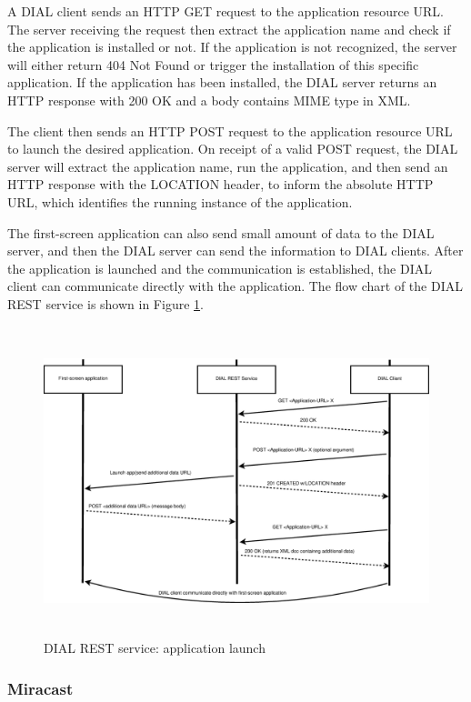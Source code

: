 \begin{enumerate}
A DIAL client sends an HTTP GET request to the application resource URL. 
The server receiving the request then extract the application name and check if the 
application is installed or not. If the application is not recognized, the 
server will either return 404 Not Found or trigger the installation of this specific 
application. If the application has been installed, the DIAL server returns 
an HTTP response with 200 OK and a body contains MIME type in XML. 

The client then sends an HTTP POST request to the application resource URL to 
launch the desired application. On receipt of a valid POST request, the DIAL 
server will extract the application name, run the application, and then send 
an HTTP response with the LOCATION header, to inform the absolute HTTP URL, which 
identifies the running instance of the application. 

The first-screen application can also send small amount of data to the DIAL 
server, and then the DIAL server can send the information to DIAL clients. 
After the application is launched and the communication is established, the DIAL 
client can communicate directly with the application. The flow chart of  the DIAL REST service is  shown in Figure \ref{dial_rest}. 

\begin{figure}[htb] \centering \includegraphics[height=9cm]{charts/dial_rest} 
\caption{DIAL REST service: application launch \label{dial_rest}} 
\end{figure} 
\end{enumerate} 

\subsubsection{Miracast} %

